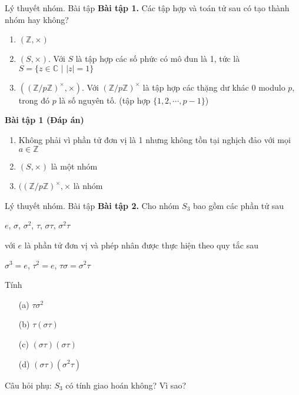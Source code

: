 \documentclass{beamer}
\begin{document}
\begin{frame}{Lý thuyết nhóm. Bài tập}
    \textbf{Bài tập 1.} Các tập hợp và toán tử sau có tạo thành nhóm hay không?
    \begin{enumerate}
        \item $(\mathbb{Z}, \times)$
        \item $(S, \times)$. Với $S$ là tập hợp các số phức có mô đun là 1, tức là $S = \{z \in \mathbb{C} \text{ | } |z| = 1\}$
        \item $((\mathbb{Z}/p\mathbb{Z})^{\times}, \times)$. Với $(\mathbb{Z}/p\mathbb{Z})^{\times}$ là tập hợp các thặng dư khác 0 modulo $p$, trong đó $p$ là số nguyên tố. (tập hợp $\{1, 2, \cdots, p-1\}$)
    \end{enumerate}
    \pause
    \textbf{Bài tập 1 (Đáp án)}
    \begin{enumerate}
        \item Không phải vì phần tử đơn vị là 1 nhưng không tồn tại nghịch đảo với mọi $a \in \mathbb{Z}$
        \item $(S, \times)$ là một nhóm
        \item $((\mathbb{Z}/p\mathbb{Z})^{\times}, \times$ là nhóm
    \end{enumerate}
\end{frame}



\begin{frame}{Lý thuyết nhóm. Bài tập}
    \textbf{Bài tập 2.} Cho nhóm $S_3$ bao gồm các phần tử sau
    \begin{center}
        $e$, $\sigma$, $\sigma^2$, $\tau$, $\sigma\tau$, $\sigma^2\tau$
    \end{center}
    với $e$ là phần tử đơn vị và phép nhân được thực hiện theo quy tắc sau
    \begin{center}
        $\sigma^3 = e$, $\tau^2 = e$, $\tau\sigma = \sigma^2\tau$
    \end{center}
    Tính 
    \begin{enumerate}
        \item [(a)] $\tau\sigma^2$
        \item [(b)] $\tau(\sigma\tau)$
        \item [(c)] $(\sigma\tau)(\sigma\tau)$
        \item [(d)] $(\sigma\tau)(\sigma^2\tau)$
    \end{enumerate}
    Câu hỏi phụ: $S_3$ có tính giao hoán không? Vì sao?
\end{frame}
\end{document}
